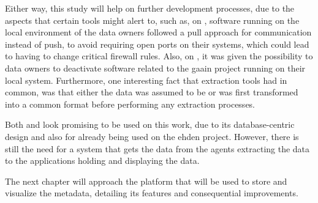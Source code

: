 Either way, this study will help on further development processes, due to the aspects that certain tools might alert to, such as, on \cite{popmednet}, software running on the local environment of the data owners followed a pull approach for communication instead of push, to avoid requiring open ports on their systems, which could lead to having to change critical firewall rules.
Also, on \cite{gaain}, it was given the possibility to data owners to deactivate software related to the \gls{gaain} project running on their local system.
Furthermore, one interesting fact that extraction tools had in common, was that either the data was assumed to be or was first transformed into a common format before performing any extraction processes.

Both \cite{montra} and \cite{achilles-github} look promising to be used on this work, due to its database-centric design and also for already being used on the \gls{ehden} project.
However, there is still the need for a system that gets the data from the agents extracting the data to the applications holding and displaying the data.

The next chapter will approach the platform that will be used to store and visualize the metadata, detailing its features and consequential improvements.
